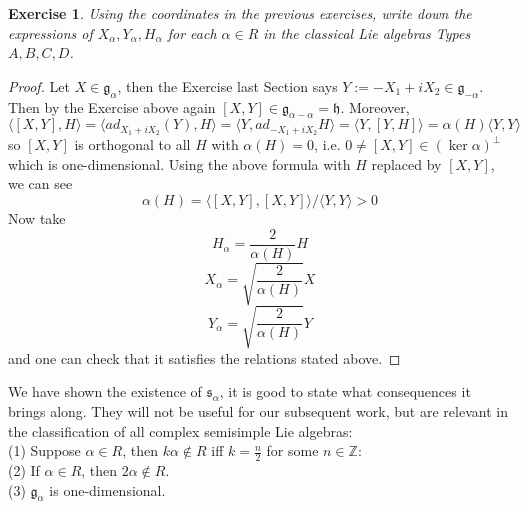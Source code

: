 \documentclass[11pt]{book}
\newtheorem{exercise}[theorem]{Exercise}
\newcommand{\bb}[1]{\mathbb{#1}}
\newcommand{\mf}[1]{\mathfrak{#1}}
\begin{document}
\begin{exercise}
Using the coordinates in the previous exercises, write down the expressions of $X_{\alpha}, Y_{\alpha}, H_{\alpha}$ for each $\alpha \in R$ in the classical Lie algebras Types $A, B, C, D$.
\end{exercise}

\begin{proof}
Let $X \in \mf{g}_{\alpha}$, then the Exercise last Section says $Y := -X_1 + iX_2 \in \mf{g}_{-\alpha}$. Then by the Exercise above again $[X,Y] \in \mf{g}_{\alpha - \alpha} = \mf{h}$. Moreover,
$$\langle [X,Y], H \rangle = \langle ad_{X_1 + i X_2} (Y), H \rangle = \langle Y, ad_{-X_1 + iX_2}H \rangle =  \langle Y, [Y,H] \rangle = \alpha(H) \langle Y, Y \rangle$$
so $[X,Y]$ is orthogonal to all $H$ with $\alpha(H) = 0$, i.e. $0 \neq [X,Y] \in (\ker \alpha)^{\perp}$ which is one-dimensional. Using the above formula with $H$ replaced by $[X,Y]$, we can see
$$\alpha (H) = \langle [X,Y], [X,Y] \rangle/ \langle Y, Y \rangle > 0$$
Now take
$$H_{\alpha} = \frac{2}{\alpha(H)}H$$
$$X_{\alpha} = \sqrt{ \frac{2}{\alpha(H)}}X$$
$$Y_{\alpha} = \sqrt{ \frac{2}{\alpha(H)}}Y$$
and one can check that it satisfies the relations stated above.
\end{proof}

We have shown the existence of $\mf{s}_{\alpha}$, it is good to state what consequences it brings along. They will not be useful for our subsequent work, but are relevant in the classification of all complex semisimple Lie algebras:\\
(1) Suppose $\alpha \in R$, then $k\alpha \notin R$ iff $k = \frac{n}{2}$ for some $n \in \bb{Z}$:\\
(2) If $\alpha \in R$, then $2\alpha \notin R$.\\
(3) $\mf{g}_{\alpha}$ is one-dimensional.\\
\end{document}
